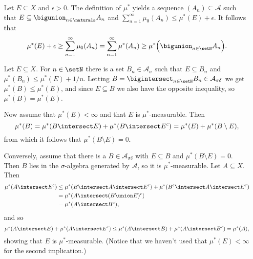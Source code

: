 \documentclass[article, a4paper, 11pt, oneside]{memoir}
\numberwithin{equation}{chapter}
\newcommand{\calA}{\mathcal{A}}
\begin{document}
\begin{solution}
	\item Let $E \subseteq X$ and $\epsilon > 0$. The definition of $\mu^*$ yields a sequence $(A_n) \subseteq \calA$ such that $E \subseteq \bigunion_{n\in\naturals} A_n$ and $\sum_{n=1}^\infty \mu_0(A_n) \leq \mu^*(E) + \epsilon$. It follows that
	\begin{equation*}
		\mu^*(E) + \epsilon
			\geq \sum_{n=1}^\infty \mu_0(A_n)
			= \sum_{n=1}^\infty \mu^*(A_n)
			\geq \mu^* \Bigl( \bigunion_{n \in \setN} A_n \Bigr).
	\end{equation*}

	\item Let $E \subseteq X$. For $n \in \setN$ there is a set $B_n \in \calA_\sigma$ such that $E \subseteq B_n$ and $\mu^*(B_n) \leq \mu^*(E) + 1/n$. Letting $B = \bigintersect_{n \in \setN} B_n \in \calA_{\sigma\delta}$ we get $\mu^*(B) \leq \mu^*(E)$, and since $E \subseteq B$ we also have the opposite inequality, so $\mu^*(B) = \mu^*(E)$.
	
	Now assume that $\mu^*(E) < \infty$ and that $E$ is $\mu^*$-measurable. Then
	\begin{equation*}
		\mu^*(B)
			= \mu^*(B \intersect E) + \mu^*(B \intersect E^c)
			= \mu^*(E) + \mu^*(B \setminus E),
	\end{equation*}
	from which it follows that $\mu^*(B \setminus E) = 0$.

	Conversely, assume that there is a $B \in \calA_{\sigma\delta}$ with $E \subseteq B$ and $\mu^*(B \setminus E) = 0$. Then $B$ lies in the $\sigma$-algebra generated by $\calA$, so it is $\mu^*$-measurable. Let $A \subseteq X$. Then
	\begin{align*}
		\mu^*(A \intersect E^c)
			&\leq \mu^*(B \intersect A \intersect E^c) + \mu^*(B^c \intersect A \intersect E^c) \\
			&= \mu^*(A \intersect (B \union E)^c) \\
			&= \mu^*(A \intersect B^c),
	\end{align*}
	and so
	\begin{equation*}
		\mu^*(A \intersect E) + \mu^*(A \intersect E^c)
			\leq \mu^*(A \intersect B) + \mu^*(A \intersect B^c)
			= \mu^*(A),
	\end{equation*}
	showing that $E$ is $\mu^*$-measurable. (Notice that we haven't used that $\mu^*(E) < \infty$ for the second implication.)


\end{solution}
\end{document}
